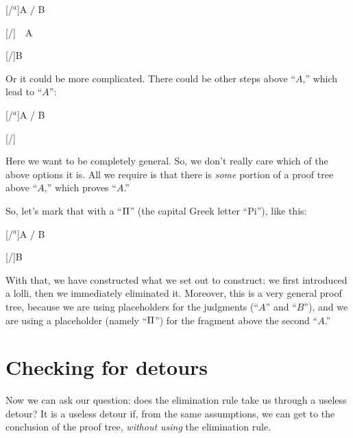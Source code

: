 \documentclass[../../../main.tex]{subfiles}
\begin{document}
\begin{prooftree*}
  \ellipsis{}{}
  [\lolliIntro/$^{a}$]{A \lolli/ B}
  
  \hypo{}
  [\startrule/]{~~A~~}
  
  [\lolliElim/]{B}
\end{prooftree*}

\noindent
Or it could be more complicated. There could be other steps above ``$A$,'' which lead to ``$A$'':

\begin{prooftree*}
  \ellipsis{}{}
  [\lolliIntro/$^{a}$]{A \lolli/ B}
  
  \ellipsis{}{}
  
  [\lolliElim/]{}
\end{prooftree*}

\noindent
Here we want to be completely general. So, we don't really care which of the above options it is. All we require is that there is \emph{some} portion of a proof tree above ``$A$,'' which proves ``$A$.''

So, let's mark that with a ``$\Proof/$'' (the capital Greek letter ``Pi''), like this:

\begin{prooftree*}
  \ellipsis{}{}
  [\lolliIntro/$^{a}$]{A \lolli/ B}
  
  \hypo{\Proof/}
  \ellipsis{}{}
  
  [\lolliElim/]{B}
\end{prooftree*}

\noindent
With that, we have constructed what we set out to construct: we first introduced a lolli, then we immediately eliminated it. Moreover, this is a very general proof tree, because we are using placeholders for the judgments (``$A$'' and ``$B$''), and we are using a placeholder (namely ``$\Proof/$'') for the fragment above the second ``$A$.''


\section{Checking for detours}

Now we can ask our question: does the elimination rule take us through a useless detour? It is a useless detour if, from the same assumptions, we can get to the conclusion of the proof tree, \emph{without using} the elimination rule.
\end{document}

